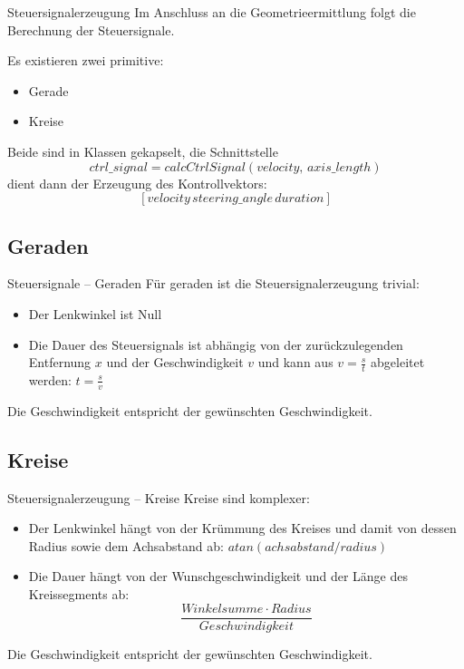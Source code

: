 \begin{frame}{Steuersignalerzeugung}
Im Anschluss an die Geometrieermittlung folgt die Berechnung der Steuersignale.

Es existieren zwei primitive:
\begin{itemize}
\item Gerade
\item Kreise
\end{itemize}
Beide sind in Klassen gekapselt, die Schnittstelle
\[ctrl\_signal = calcCtrlSignal(velocity,\,axis\_length)\]
dient dann der Erzeugung des Kontrollvektors:
\[[velocity\,steering\_angle\,duration]\]
\end{frame}

\subsection{Geraden}
\begin{frame}{Steuersignale -- Geraden}
Für geraden ist die Steuersignalerzeugung trivial:
\begin{itemize}
\item Der Lenkwinkel ist Null
\item Die Dauer des Steuersignals ist abhängig von der zurückzulegenden Entfernung $x$ und der Geschwindigkeit $v$ und kann aus $v=\frac{s}{t}$ abgeleitet werden: $t=\frac{s}{v}$
\end{itemize}
Die Geschwindigkeit entspricht der gewünschten Geschwindigkeit.
\end{frame}

\subsection{Kreise}
\begin{frame}{Steuersignalerzeugung -- Kreise}
Kreise sind komplexer:
\begin{itemize}
\item Der Lenkwinkel hängt von der Krümmung des Kreises und damit von dessen Radius sowie dem Achsabstand ab:  $atan(achsabstand/radius)$
\item Die Dauer hängt von der Wunschgeschwindigkeit und der Länge des Kreissegments ab: \[\frac{Winkelsumme\cdot Radius}{Geschwindigkeit}\]
\end{itemize}
Die Geschwindigkeit entspricht der gewünschten Geschwindigkeit.
\end{frame}